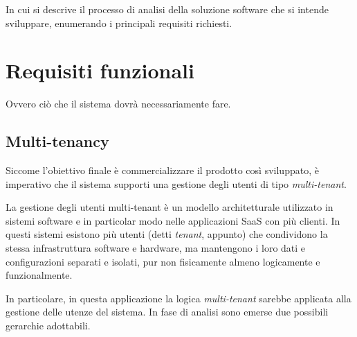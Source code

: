 In cui si descrive il processo di analisi della soluzione software che si intende sviluppare, enumerando i principali requisiti richiesti.

\section{Requisiti funzionali}
Ovvero ciò che il sistema dovrà necessariamente fare.

\subsection{Multi-tenancy}
Siccome l'obiettivo finale è commercializzare il prodotto così sviluppato, è imperativo che il sistema supporti una gestione degli utenti di tipo \emph{multi-tenant}.

La gestione degli utenti multi-tenant è un modello architetturale utilizzato in sistemi software e in particolar modo nelle applicazioni SaaS con più clienti. In questi sistemi esistono più utenti (detti \emph{tenant}, appunto) che condividono la stessa infrastruttura software e hardware, ma mantengono i loro dati e configurazioni separati e isolati, pur non fisicamente almeno logicamente e funzionalmente.

In particolare, in questa applicazione la logica \emph{multi-tenant} sarebbe applicata alla gestione delle utenze del sistema. In fase di analisi sono emerse due possibili gerarchie adottabili.

